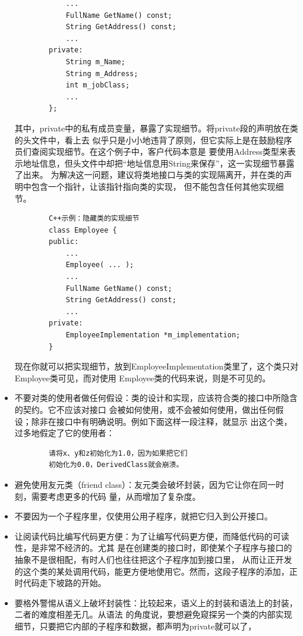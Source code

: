 \documentclass{article}
\begin{document}
\begin{itemize}
\begin{lstlisting}
            ...
            FullName GetName() const;
            String GetAddress() const;
            ...
        private:
            String m_Name;
            String m_Address;
            int m_jobClass;
            ...
        };
    \end{lstlisting}
    其中，private中的私有成员变量，暴露了实现细节。将private段的声明放在类的头文件中，看上去
    似乎只是小小地违背了原则，但它实际上是在鼓励程序员们查阅实现细节。在这个例子中，客户代码本意是
    要使用Address类型来表示地址信息，但头文件中却把“地址信息用String来保存”，这一实现细节暴露了出来。
    为解决这一问题，建议将类地接口与类的实现隔离开，并在类的声明中包含一个指针，让该指针指向类的实现，
    但不能包含任何其他实现细节。
    \begin{lstlisting}
        C++示例：隐藏类的实现细节
        class Employee {
        public:
            ...
            Employee( ... );
            ...
            FullName GetName() const;
            String GetAddress() const;
            ...
        private:
            EmployeeImplementation *m_implementation;
        }
    \end{lstlisting}
    现在你就可以把实现细节，放到EmployeeImplementation类里了，这个类只对Employee类可见，而对使用
    Employee类的代码来说，则是不可见的。
    \item 不要对类的使用者做任何假设：类的设计和实现，应该符合类的接口中所隐含的契约。它不应该对接口
    会被如何使用，或不会被如何使用，做出任何假设；除非在接口中有明确说明。例如下面这样一段注释，就显示
    出这个类，过多地假定了它的使用者：
    \begin{lstlisting}
        请将x、y和z初始化为1.0，因为如果把它们
        初始化为0.0，DerivedClass就会崩溃。
    \end{lstlisting}
    \item 避免使用友元类（friend class）：友元类会破坏封装，因为它让你在同一时刻，需要考虑更多的代码
    量，从而增加了复杂度。
    \item 不要因为一个子程序里，仅使用公用子程序，就把它归入到公开接口。
    \item 让阅读代码比编写代码更方便：为了让编写代码更方便，而降低代码的可读性，是非常不经济的。尤其
    是在创建类的接口时，即使某个子程序与接口的抽象不是很相配，有时人们也往往把这个子程序加到接口里，
    从而让正开发的这个类的某处调用代码，能更方便地使用它。然而，这段子程序的添加，正时代码走下坡路的开始。
    \item 要格外警惕从语义上破坏封装性：比较起来，语义上的封装和语法上的封装，二者的难度相差无几。从语法
    的角度说，要想避免窥探另一个类的内部实现细节，只要把它内部的子程序和数据，都声明为private就可以了，

\end{itemize}
\end{document}
